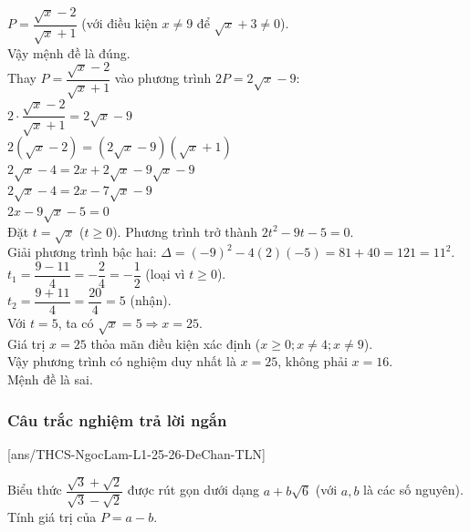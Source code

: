 \begin{ex}
{\begin{itemchoice}
$P = \dfrac{\sqrt{x}-2}{\sqrt{x}+1}$ (với điều kiện $x \ne 9$ để $\sqrt{x}+3 \ne 0$). \\
Vậy mệnh đề là đúng. \\
Thay $P = \dfrac{\sqrt{x}-2}{\sqrt{x}+1}$ vào phương trình $2P = 2\sqrt{x}-9$: \\
$2 \cdot \dfrac{\sqrt{x}-2}{\sqrt{x}+1} = 2\sqrt{x}-9$ \\
$2(\sqrt{x}-2) = (2\sqrt{x}-9)(\sqrt{x}+1)$ \\
$2\sqrt{x}-4 = 2x + 2\sqrt{x} - 9\sqrt{x} - 9$ \\
$2\sqrt{x}-4 = 2x - 7\sqrt{x} - 9$ \\
$2x - 9\sqrt{x} - 5 = 0$ \\
Đặt $t = \sqrt{x}$ ($t \ge 0$). Phương trình trở thành $2t^2 - 9t - 5 = 0$. \\
Giải phương trình bậc hai: $\Delta = (-9)^2 - 4(2)(-5) = 81 + 40 = 121 = 11^2$. \\
$t_1 = \dfrac{9-11}{4} = -\dfrac{2}{4} = -\dfrac{1}{2}$ (loại vì $t \ge 0$). \\
$t_2 = \dfrac{9+11}{4} = \dfrac{20}{4} = 5$ (nhận). \\
Với $t=5$, ta có $\sqrt{x}=5 \Rightarrow x=25$. \\
Giá trị $x=25$ thỏa mãn điều kiện xác định ($x \ge 0; x \ne 4; x \ne 9$). \\
Vậy phương trình có nghiệm duy nhất là $x=25$, không phải $x=16$. \\
Mệnh đề là sai. \\
\end{itemchoice}
}
\end{ex}

\subsubsection{Câu trắc nghiệm trả lời ngắn}
[ans/THCS-NgocLam-L1-25-26-DeChan-TLN]
\begin{ex}%
Biểu thức $\dfrac{\sqrt{3}+\sqrt{2}}{\sqrt{3}-\sqrt{2}}$ được rút gọn dưới dạng $a+b\sqrt{6}$ (với $a,b$ là các số nguyên). Tính giá trị của $P=a-b$.\\
\end{ex}


